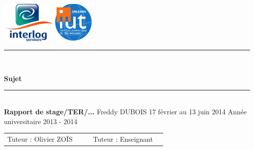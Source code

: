 \documentclass[11pt,openright,a4paper]{report}
\begin{document}
	\begin{titlepage}
		\begin{Large}
		\baselineskip=7mm
		\noindent
			\includegraphics[height=2cm]{./images/logo.png}
			\hfill
			\includegraphics[height=2cm]{./images/logo_IUT.pdf}
			\vskip 30mm
			\begin{center}
				\rule{\textwidth}{0.5 mm}\\
				{\huge\sffamily\bfseries\baselineskip=1cm
					Sujet
				\par}
				\rule{\textwidth}{0.5 mm}\\
				{\Large\sffamily\bfseries 
					Rapport de stage/TER/...
				}
					\vskip 20mm
				Freddy DUBOIS
					\vskip 5mm
				17 février au 13 juin 2014
					\vskip 5mm
				Année universitaire 2013 - 2014
					\vfill
					\vskip 45mm
				\begin{tabular}{l l p{4cm} l l}
					 Tuteur : Olivier ZOÏS		&	&	&	Tuteur : Enseignant	
				\end{tabular}
			\end{center}
		\end{Large}
	\end{titlepage}



\cleardoublepage
\sloppy %

\tableofcontents			%






\end{document}
